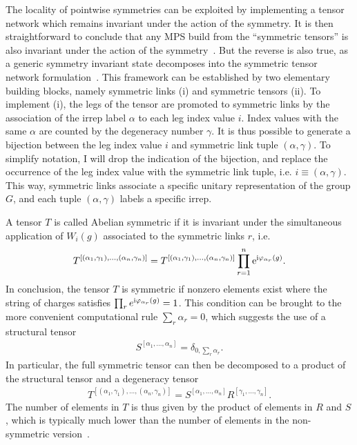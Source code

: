 The locality of pointwise symmetries can be exploited by implementing a tensor network which remains invariant under the action of the symmetry.
It is then straightforward to conclude that any MPS build from the ``symmetric tensors'' is also invariant under the action of the symmetry~\cite{Singh2010}.
But the reverse is also true, as a generic symmetry invariant state decomposes into the symmetric tensor network formulation~\cite{Singh2013}.
This framework can be established by two elementary building blocks, namely symmetric links (i) and symmetric tensors (ii).
To implement (i), the legs of the tensor are promoted to symmetric links by the association of the irrep label $\alpha$ to each leg index value $i$.
Index values with the same $\alpha$ are counted by the degeneracy number $\gamma$.
It is thus possible to generate a bijection between the leg index value $i$ and symmetric link tuple $(\alpha,\gamma)$.
To simplify notation, I will drop the indication of the bijection, and replace the occurrence of the leg index value with the symmetric link tuple, i.e. $i\equiv(\alpha,\gamma)$.
This way, symmetric links associate a specific unitary representation of the group $G$, and each tuple $(\alpha,\gamma)$ labels a specific irrep.

A tensor $T$ is called Abelian symmetric if it is invariant under the simultaneous application of $W_i(g)$ associated to the symmetric links $r$, i.e.
\begin{align}
    T^{[(\alpha_1,\gamma_1),\dots,(\alpha_n,\gamma_n)]} = T^{[(\alpha_1,\gamma_1),\dots,(\alpha_n,\gamma_n)]}\prod_{r=1}^n{\mathrm e^{\mathrm i \varphi_{\alpha_r}(g)}}.
    \label{eq:symmetric_tensor}
\end{align}
In conclusion, the tensor $T$ is symmetric if nonzero elements exist where the string of charges satisfies $\prod_r {e^{\mathrm i\varphi_{\alpha_r}(g)}} = 1$.
This condition can be brought to the more convenient computational rule $\sum_r\alpha_r = 0$, which suggests the use of a structural tensor~\cite{Silvi2019}
\begin{align}
    S^{[\alpha_1,\dots,\alpha_n]} = \delta_{0,\sum_r\alpha_r}.
\end{align}
In particular, the full symmetric tensor can then be decomposed to a product of the structural tensor and a degeneracy tensor
\begin{align}
    T^{[(\alpha_1,\gamma_1),\dots,(\alpha_n,\gamma_n)]} = S^{[\alpha_1,\dots,\alpha_n]} R^{[\gamma_1,\dots,\gamma_n]}.
\end{align}
The number of elements in $T$ is thus given by the product of elements in $R$ and $S$, which is typically much lower than the number of elements in the non-symmetric version~\cite{Silvi2019}.

